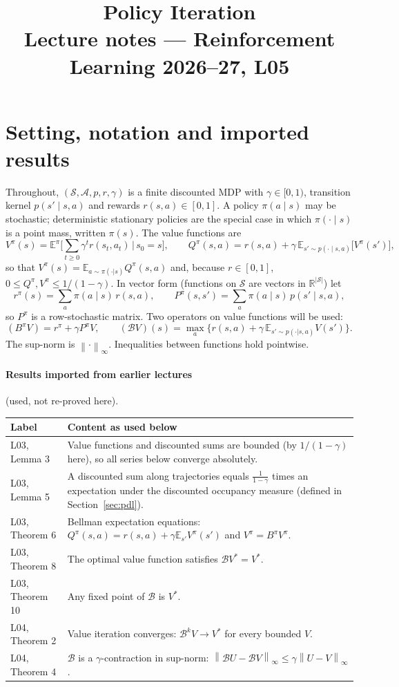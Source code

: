 \documentclass[11pt,a4paper]{article}
\title{\textbf{Policy Iteration}\\[2pt]\large Lecture notes --- Reinforcement Learning 2026--27, L05}
\date{}
\newcommand{\E}{\mathbb{E}}
\newcommand{\R}{\mathbb{R}}
\newcommand{\Sset}{\mathcal{S}}
\newcommand{\Aset}{\mathcal{A}}
\newcommand{\B}{\mathcal{B}}
\newcommand{\norm}[1]{\left\lVert #1\right\rVert_\infty}
\theoremstyle{plain}
\theoremstyle{definition}
\theoremstyle{remark}
\begin{document}
\maketitle
\tableofcontents

\section*{Setting, notation and imported results}

Throughout, $(\Sset,\Aset,p,r,\gamma)$ is a finite discounted MDP with $\gamma\in[0,1)$, transition kernel $p(s'\mid s,a)$ and rewards $r(s,a)\in[0,1]$. A policy $\pi(a\mid s)$ may be stochastic; deterministic stationary policies are the special case in which $\pi(\cdot\mid s)$ is a point mass, written $\pi(s)$. The value functions are
\[
V^\pi(s)=\E^\pi\Big[\sum_{t\ge 0}\gamma^t r(s_t,a_t)\,\Big|\,s_0=s\Big],\qquad
Q^\pi(s,a)=r(s,a)+\gamma\,\E_{s'\sim p(\cdot\mid s,a)}\big[V^\pi(s')\big],
\]
so that $V^\pi(s)=\E_{a\sim\pi(\cdot|s)}Q^\pi(s,a)$ and, because $r\in[0,1]$, $0\le Q^\pi,V^\pi\le 1/(1-\gamma)$. In vector form (functions on $\Sset$ are vectors in $\R^{|\Sset|}$) let
\[
r^\pi(s)=\sum_a\pi(a\mid s)\,r(s,a),\qquad P^\pi(s,s')=\sum_a\pi(a\mid s)\,p(s'\mid s,a),
\]
so $P^\pi$ is a row-stochastic matrix. Two operators on value functions will be used:
\[
(B^\pi V)=r^\pi+\gamma P^\pi V,\qquad (\B V)(s)=\max_a\Big\{r(s,a)+\gamma\,\E_{s'\sim p(\cdot|s,a)}V(s')\Big\}.
\]
The sup-norm is $\norm{\cdot}$. Inequalities between functions hold pointwise.

\paragraph{Results imported from earlier lectures} (used, not re-proved here).
\begin{center}\small
\begin{tabular}{@{}lp{}@{}}
\toprule
\textbf{Label} & \textbf{Content as used below}\\
\midrule
L03, Lemma 3 & Value functions and discounted sums are bounded (by $1/(1-\gamma)$ here), so all series below converge absolutely.\\
L03, Lemma 5 & A discounted sum along trajectories equals $\frac1{1-\gamma}$ times an expectation under the discounted occupancy measure (defined in Section~\ref{sec:pdl}).\\
L03, Theorem 6 & Bellman expectation equations: $Q^\pi(s,a)=r(s,a)+\gamma\E_{s'}V^\pi(s')$ and $V^\pi=B^\pi V^\pi$.\\
L03, Theorem 8 & The optimal value function satisfies $\B V^*=V^*$.\\
L03, Theorem 10 & Any fixed point of $\B$ is $V^*$.\\
L04, Theorem 2 & Value iteration converges: $\B^kV\to V^*$ for every bounded $V$.\\
L04, Theorem 4 & $\B$ is a $\gamma$-contraction in sup-norm: $\norm{\B U-\B V}\le\gamma\norm{U-V}$.\\
\bottomrule
\end{tabular}
\end{center}
\end{document}
